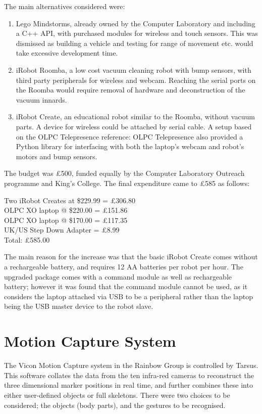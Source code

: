 \documentclass[12pt,a4,notitlepage]{report}
\renewcommand{\_}{\texttt{\symbol{95}}}
\newcommand{\<}{\texttt{\symbol{60}}}
\renewcommand{\>}{\texttt{\symbol{62}}}
\begin{document}
The main alternatives considered were:
\begin{enumerate}
\item Lego Mindstorms, already owned by the Computer Laboratory and including a C++ API, with purchased modules for wireless and touch sensors. This was dismissed as building a vehicle and testing for range of movement etc. would take excessive development time.
\item iRobot Roomba, a low cost vacuum cleaning robot with bump sensors, with third party peripherals for wireless and webcam. Reaching the serial ports on the Roomba would require removal of hardware and deconstruction of the vacuum innards.
\item iRobot Create, an educational robot similar to the Roomba, without vacuum parts. A device for wireless could be attached by serial cable. A setup based on the OLPC Telepresence {reference: OLPC Telepresence} also provided a Python library for interfacing with both the laptop's webcam and robot's motors and bump sensors.
\end{enumerate}

The budget was \pounds 500, funded equally by the Computer Laboratory Outreach programme and King's College. The final expenditure came to \pounds 585 as follows:

Two iRobot Creates at \$229.99 = \pounds 306.80 \\
OLPC XO laptop @ \$220.00 = \pounds 151.86 \\
OLPC XO laptop @ \$170.00 = \pounds 117.35 \\
UK/US Step Down Adapter = \pounds 8.99 \\
Total: \pounds 585.00

The main reason for the increase was that the basic iRobot Create comes without a rechargeable battery, and requires 12 AA batteries per robot per hour. The upgraded package comes with a command module as well as rechargeable battery; however it was found that the command module cannot be used, as it considers the laptop attached via USB to be a peripheral rather than the laptop being the USB master device to the robot slave.

\section{Motion Capture System}

The Vicon Motion Capture system in the Rainbow Group is controlled by Tarsus. This software collates the data from the ten infra-red cameras to reconstruct the three dimensional marker positions in real time, and further combines these into either user-defined objects or full skeletons. There were two choices to be considered; the objects (body parts), and the gestures to be recognised.
\end{document}
